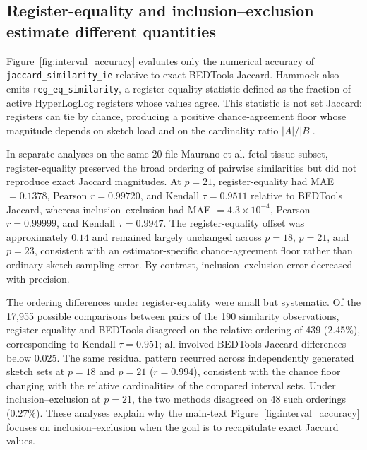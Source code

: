 \subsection{Register-equality and inclusion--exclusion estimate different quantities}

Figure~\ref{fig:interval_accuracy} evaluates only the numerical accuracy of \texttt{jaccard\_similarity\_ie} relative to exact BEDTools Jaccard. Hammock also emits \texttt{reg\_eq\_similarity}, a register-equality statistic defined as the fraction of active HyperLogLog registers whose values agree. This statistic is not set Jaccard: registers can tie by chance, producing a positive chance-agreement floor whose magnitude depends on sketch load and on the cardinality ratio $|A|/|B|$.

In separate analyses on the same 20-file Maurano et al. fetal-tissue subset, register-equality preserved the broad ordering of pairwise similarities but did not reproduce exact Jaccard magnitudes. At $p=21$, register-equality had MAE $=0.1378$, Pearson $r=0.99720$, and Kendall $\tau=0.9511$ relative to BEDTools Jaccard, whereas inclusion--exclusion had MAE $=4.3\times10^{-4}$, Pearson $r=0.99999$, and Kendall $\tau=0.9947$. The register-equality offset was approximately $0.14$ and remained largely unchanged across $p=18$, $p=21$, and $p=23$, consistent with an estimator-specific chance-agreement floor rather than ordinary sketch sampling error. By contrast, inclusion--exclusion error decreased with precision.

The ordering differences under register-equality were small but systematic. Of the 17,955 possible comparisons between pairs of the 190 similarity observations, register-equality and BEDTools disagreed on the relative ordering of 439 (2.45\%), corresponding to Kendall $\tau=0.951$; all involved BEDTools Jaccard differences below 0.025. The same residual pattern recurred across independently generated sketch sets at $p=18$ and $p=21$ ($r=0.994$), consistent with the chance floor changing with the relative cardinalities of the compared interval sets. Under inclusion--exclusion at $p=21$, the two methods disagreed on 48 such orderings (0.27\%). These analyses explain why the main-text Figure~\ref{fig:interval_accuracy} focuses on inclusion--exclusion when the goal is to recapitulate exact Jaccard values.

